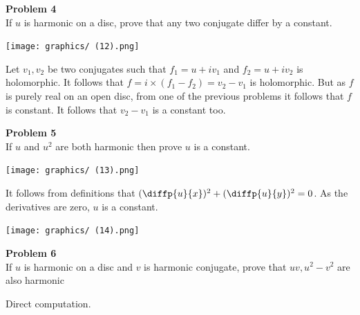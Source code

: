 \documentclass[12pt,oneside]{book}
\begin{document}
\begin{tcolorbox}[colback=blue!15]
    \textbf{Problem 4}\\
    If $u$ is harmonic on a disc, prove that any two conjugate differ by a constant.
\end{tcolorbox}
\begin{marginfigure}%
    \texttt{[image: graphics/ (12).png]}
\end{marginfigure}
Let $v_1,v_2$ be two conjugates such that $f_1=u+iv_1$ and $f_2=u+iv_2$ is holomorphic. It follows that $f=i\times(f_1-f_2)=v_2-v_1$ is holomorphic. But as $f$ is purely real on an open disc, from one of the previous problems it follows that $f$ is constant. It follows that $v_2-v_1$ is a constant too.

\begin{tcolorbox}[colback=blue!15]
    \textbf{Problem 5}\\
    If $u$ and $u^2$ are both harmonic then prove $u$ is a constant.
\end{tcolorbox}
\begin{marginfigure}%
    \texttt{[image: graphics/ (13).png]}
\end{marginfigure}
It follows from definitions that $(\diffp{u}{x})^2+(\diffp{u}{y})^2=0$. As the derivatives are zero, $u$ is a constant.

\begin{marginfigure}%
    \texttt{[image: graphics/ (14).png]}
\end{marginfigure}
\begin{tcolorbox}[colback=blue!15]
    \textbf{Problem 6}\\
    If $u$ is harmonic on a disc and $v$ is harmonic conjugate, prove that $uv,u^2-v^2$ are also harmonic
\end{tcolorbox}
Direct computation.


 
\end{document}
